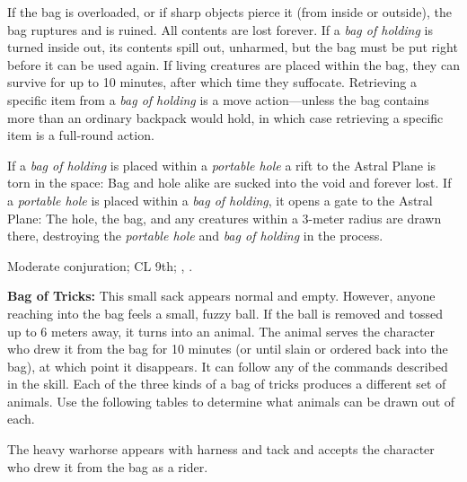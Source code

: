 
If the bag is overloaded, or if sharp objects pierce it (from inside or outside), the bag ruptures and is ruined. All contents are lost forever. If a \emph{bag of holding} is turned inside out, its contents spill out, unharmed, but the bag must be put right before it can be used again. If living creatures are placed within the bag, they can survive for up to 10 minutes, after which time they suffocate. Retrieving a specific item from a \emph{bag of holding} is a move action---unless the bag contains more than an ordinary backpack would hold, in which case retrieving a specific item is a full-round action.

If a \emph{bag of holding} is placed within a \emph{portable hole} a rift to the Astral Plane is torn in the space: Bag and hole alike are sucked into the void and forever lost. If a \emph{portable hole} is placed within a \emph{bag of holding}, it opens a gate to the Astral Plane: The hole, the bag, and any creatures within a 3-meter radius are drawn there, destroying the \emph{portable hole} and \emph{bag of holding} in the process.

Moderate conjuration; CL 9th; , .



\textbf{Bag of Tricks:} This small sack appears normal and empty. However, anyone reaching into the bag feels a small, fuzzy ball. If the ball is removed and tossed up to 6 meters away, it turns into an animal. The animal serves the character who drew it from the bag for 10 minutes (or until slain or ordered back into the bag), at which point it disappears. It can follow any of the commands described in the  skill. Each of the three kinds of a bag of tricks produces a different set of animals. Use the following tables to determine what animals can be drawn out of each.

The heavy warhorse appears with harness and tack and accepts the character who drew it from the bag as a rider.

